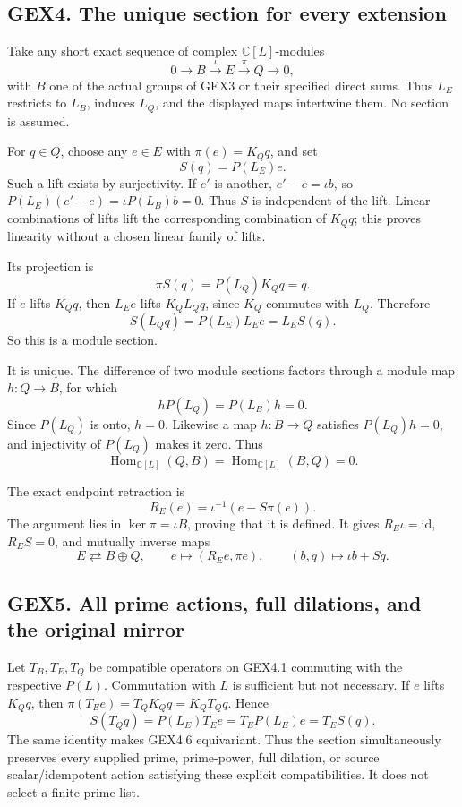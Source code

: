 \subsection{GEX4. The unique section for every
extension}\label{gex4.-the-unique-section-for-every-extension}

Take any short exact sequence of complex \(\mathbb C[L]\)-modules \[
0\longrightarrow B\xrightarrow{\iota}E\xrightarrow{\pi}Q
\longrightarrow0,
\tag{GEX4.1}
\] with \(B\) one of the actual groups of GEX3 or their specified direct
sums. Thus \(L_E\) restricts to \(L_B\), induces \(L_Q\), and the
displayed maps intertwine them. No section is assumed.

For \(q\in Q\), choose any \(e\in E\) with \(\pi(e)=K_Qq\), and set \[
\boxed{S(q)=P(L_E)e.}
\tag{GEX4.2}
\] Such a lift exists by surjectivity. If \(e'\) is another,
\(e'-e=\iota b\), so \(P(L_E)(e'-e)=\iota P(L_B)b=0\). Thus \(S\) is
independent of the lift. Linear combinations of lifts lift the
corresponding combination of \(K_Qq\); this proves linearity without a
chosen linear family of lifts.

Its projection is \[
\pi S(q)=P(L_Q)K_Qq=q.
\tag{GEX4.3}
\] If \(e\) lifts \(K_Qq\), then \(L_Ee\) lifts \(K_QL_Qq\), since
\(K_Q\) commutes with \(L_Q\). Therefore \[
S(L_Qq)=P(L_E)L_Ee=L_ES(q).
\tag{GEX4.4}
\] So this is a module section.

It is unique. The difference of two module sections factors through a
module map \(h:Q\to B\), for which \[
hP(L_Q)=P(L_B)h=0.
\] Since \(P(L_Q)\) is onto, \(h=0\). Likewise a map \(h:B\to Q\)
satisfies \(P(L_Q)h=0\), and injectivity of \(P(L_Q)\) makes it zero.
Thus \[
\operatorname{Hom}_{\mathbb C[L]}(Q,B)
=\operatorname{Hom}_{\mathbb C[L]}(B,Q)=0.
\tag{GEX4.5}
\]

The exact endpoint retraction is \[
R_E(e)=\iota^{-1}(e-S\pi(e)).
\tag{GEX4.6}
\] The argument lies in \(\ker\pi=\iota B\), proving that it is defined.
It gives \(R_E\iota=\mathrm{id}\), \(R_ES=0\), and mutually inverse maps
\[
E\rightleftarrows B\oplus Q,\qquad
e\mapsto(R_Ee,\pi e),\qquad
(b,q)\mapsto\iota b+Sq .
\tag{GEX4.7}
\]

\subsection{GEX5. All prime actions, full dilations, and the original
mirror}\label{gex5.-all-prime-actions-full-dilations-and-the-original-mirror}

Let \(T_B,T_E,T_Q\) be compatible operators on GEX4.1 commuting with the
respective \(P(L)\). Commutation with \(L\) is sufficient but not
necessary. If \(e\) lifts \(K_Qq\), then \(\pi(T_Ee)=T_QK_Qq=K_QT_Qq\).
Hence \[
S(T_Qq)=P(L_E)T_Ee=T_EP(L_E)e=T_ES(q).
\tag{GEX5.1}
\] The same identity makes GEX4.6 equivariant. Thus the section
simultaneously preserves every supplied prime, prime-power, full
dilation, or source scalar/idempotent action satisfying these explicit
compatibilities. It does not select a finite prime list.

